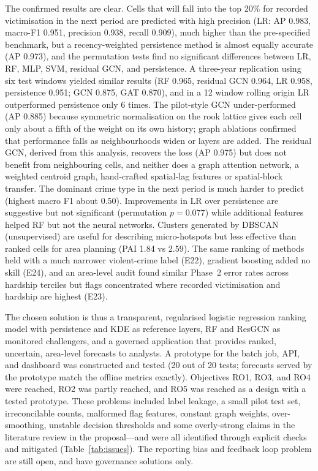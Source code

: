 \documentclass[11pt,a4paper]{report}
\begin{document}
The confirmed results are clear. Cells that will fall into the top 20\% for recorded victimisation in the next period are predicted with high precision (LR: AP 0.983, macro-F1 0.951, precision 0.938, recall 0.909), much higher than the pre-specified benchmark, but a recency-weighted persistence method is almost equally accurate (AP 0.973), and the permutation tests find no significant differences between LR, RF, MLP, SVM, residual GCN, and persistence. A three-year replication using six test windows yielded similar results (RF 0.965, residual GCN 0.964, LR 0.958, persistence 0.951; GCN 0.875, GAT 0.870), and in a 12 window rolling origin LR outperformed persistence only 6 times. The pilot-style GCN under-performed (AP 0.885) because symmetric normalisation on the rook lattice gives each cell only about a fifth of the weight on its own history; graph ablations confirmed that performance falls as neighbourhoods widen or layers are added. The residual GCN, derived from this analysis, recovers the loss (AP 0.975) but does not benefit from neighbouring cells, and neither does a graph attention network, a weighted centroid graph, hand-crafted spatial-lag features or spatial-block transfer. The dominant crime type in the next period is much harder to predict (highest macro F1 about 0.50). Improvements in LR over persistence are suggestive but not significant (permutation $p=0.077$) while additional features helped RF but not the neural networks. Clusters generated by DBSCAN (unsupervised) are useful for describing micro-hotspots but less effective than ranked cells for area planning (PAI 1.84 vs 2.59). The same ranking of methods held with a much narrower violent-crime label (E22), gradient boosting added no skill (E24), and an area-level audit found similar Phase~2 error rates across hardship terciles but flags concentrated where recorded victimisation and hardship are highest (E23).

The chosen solution is thus a transparent, regularised logistic regression ranking model with persistence and KDE as reference layers, RF and ResGCN as monitored challengers, and a governed application that provides ranked, uncertain, area-level forecasts to analysts. A prototype for the batch job, API, and dashboard was constructed and tested (20 out of 20 tests; forecasts served by the prototype match the offline metrics exactly). Objectives RO1, RO3, and RO4 were reached, RO2 was partly reached, and RO5 was reached as a design with a tested prototype. These problems included label leakage, a small pilot test set, irreconcilable counts, malformed flag features, constant graph weights, over-smoothing, unstable decision thresholds and some overly-strong claims in the literature review in the proposal---and were all identified through explicit checks and mitigated (Table~\ref{tab:issues}). The reporting bias and feedback loop problem are still open, and have governance solutions only.
\end{document}
